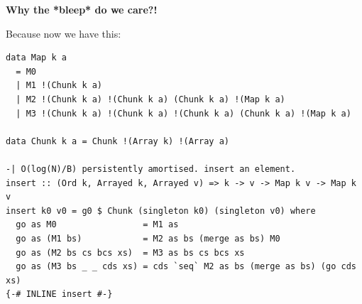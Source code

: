 \documentclass{beamer}
\begin{document}

\begin{frame}[fragile]

\textbf{Why the *bleep* do we care?!}
\pause
\bigskip

Because now we have this:

\begin{verbatim}
data Map k a
  = M0 
  | M1 !(Chunk k a) 
  | M2 !(Chunk k a) !(Chunk k a) (Chunk k a) !(Map k a)
  | M3 !(Chunk k a) !(Chunk k a) !(Chunk k a) (Chunk k a) !(Map k a)
  
data Chunk k a = Chunk !(Array k) !(Array a)

-| O(log(N)/B) persistently amortised. insert an element.
insert :: (Ord k, Arrayed k, Arrayed v) => k -> v -> Map k v -> Map k v
insert k0 v0 = g0 $ Chunk (singleton k0) (singleton v0) where
  go as M0                 = M1 as
  go as (M1 bs)            = M2 as bs (merge as bs) M0
  go as (M2 bs cs bcs xs)  = M3 as bs cs bcs xs
  go as (M3 bs _ _ cds xs) = cds `seq` M2 as bs (merge as bs) (go cds xs)
{-# INLINE insert #-}
\end{verbatim}

\end{frame}

\end{document}
